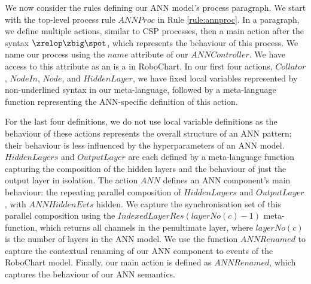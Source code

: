 We now consider the rules defining our ANN model's process paragraph. We start with the top-level process rule $ANNProc$ in Rule \ref{rule:annproc}. In a paragraph, we define multiple actions, similar to CSP processes, then a main action after the syntax $\circspot$, which represents the behaviour of this process. We name our process using the $name$ attribute of our $ANNController$. We have access to this attribute as an  is a  in RoboChart. In our first four actions, $Collator$, $NodeIn$, $Node$, and $HiddenLayer$, we have fixed local variables represented by non-underlined syntax in our meta-language, followed by a meta-language function representing the ANN-specific definition of this action. 

For the last four definitions, we do not use local variable definitions as the behaviour of these actions represents the overall structure of an ANN pattern; their behaviour is less influenced by the hyperparameters of an ANN model. $HiddenLayers$ and $OutputLayer$ are each defined by a meta-language function capturing the composition of the hidden layers and the behaviour of just the output layer in isolation. The action $ANN$ defines an ANN component's main behaviour: the repeating parallel composition of $HiddenLayers$ and $OutputLayer$, with $ANNHiddenEvts$ hidden. We capture the synchronisation set of this parallel composition using the $IndexedLayerRes(layerNo(c) - 1)$ meta-function, which returns all channels in the penultimate layer, where $layerNo(c)$ is the number of layers in the ANN model. We use the function $ANNRenamed$ to capture the contextual renaming of our ANN component to events of the RoboChart model. Finally, our main action is defined as $ANNRenamed$, which captures the behaviour of our ANN semantics. 

